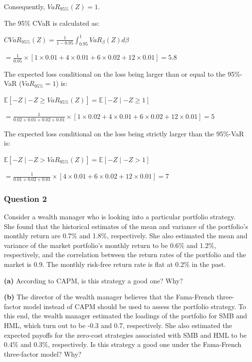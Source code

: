 Consequently, $VaR_{95\%}(Z)=1$.

The 95\% CVaR is calculated as:

\centerline{$CVaR_{95\%}(Z) = \frac{1}{1-0.95}\int_{0.95}^{1}VaR_{\beta}(Z)d\beta$}

\centerline{$= \frac{1}{0.05} \times [1 \times 0.01 + 4 \times 0.01 + 6 \times 0.02 + 12 \times 0.01]= 5.8$}


The expected loss conditional on the loss being larger than or equal to the 95\%-VaR ($VaR_{95\%}=1$) is:

\centerline{$\mathbb{E}[-Z \mid -Z \ge VaR_{95\%}(Z)] = \mathbb{E}[-Z \mid -Z \ge 1]$}

\centerline{$= \frac{1}{0.02+0.01+0.02+0.01} \times [1 \times 0.02 + 4 \times 0.01 + 6 \times 0.02 + 12 \times 0.01]=5$}


The expected loss conditional on the loss being strictly larger than the 95\%-VaR is:

\centerline{$\mathbb{E}[-Z \mid -Z > VaR_{95\%}(Z)] = \mathbb{E}[-Z \mid -Z > 1]$}

\centerline{$= \frac{1}{0.01+0.02+0.01} \times [4 \times 0.01 + 6 \times 0.02 + 12 \times 0.01]=7$}

\subsubsection*{Question 2}

Consider a wealth manager who is looking into a particular portfolio strategy. She found that the historical estimates of the mean and variance of the portfolio's monthly return are 0.7\% and 1.8\%, respectively. She also estimated the mean and variance of the market portfolio's monthly return to be 0.6\% and 1.2\%, respectively, and the correlation between the return rates of the portfolio and the market is 0.9. The monthly risk-free return rate is flat at 0.2\% in the past.

\textbf{(a)} According to CAPM, is this strategy a good one? Why?

\textbf{(b)} The director of the wealth manager believes that the Fama-French three-factor model instead of CAPM should be used to assess the portfolio strategy. To this end, the wealth manager estimated the loadings of the portfolio for SMB and HML, which turn out to be -0.3 and 0.7, respectively. She also estimated the expected payoffs for the zero-cost strategies associated with SMB and HML to be 0.4\% and 0.3\%, respectively. Is this strategy a good one under the Fama-French three-factor model? Why?

